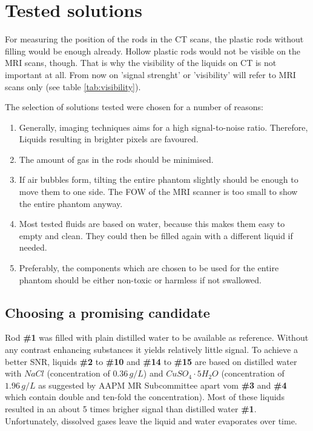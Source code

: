 \section{Tested solutions}
\newpage

For measuring the position of the rods in the CT scans, the plastic rods without filling would be enough already.
Hollow plastic rods would not be visible on the MRI scans, though.
That is why the visibility of the liquids on CT is not important at all.
From now on 'signal strenght' or 'visibility' will refer to MRI scans only (see table \ref{tab:visibility}).

The selection of solutions tested were chosen for a number of reasons:
\begin{enumerate}[label=\textbf{\arabic*.}]
\item Generally, imaging techniques aims for a high signal-to-noise ratio. Therefore, Liquids resulting in brighter pixels are favoured.
\item The amount of gas in the rods should be minimised.
\item If air bubbles form, tilting the entire phantom slightly should be enough to move them to one side. The FOW of the MRI scanner is too small to show the entire phantom anyway.
\item Most tested fluids are based on water, because this makes them easy to empty and clean.
They could then be filled again with a different liquid if needed.
\item Preferably, the components which are chosen to be used for the entire phantom should be either non-toxic or harmless if not swallowed.
\end{enumerate}

\subsection{Choosing a promising candidate}

Rod \textbf{\#1} was filled with plain distilled water to be available as reference.
Without any contrast enhancing substances it yields relatively little signal.
To achieve a better SNR, liquids \textbf{\#2} to \textbf{\#10} and \textbf{\#14} to \textbf{\#15} are based on distilled water with $NaCl$ (concentration of $0.36 \, g/L$) and $CuSO_4\cdot5H_2O$ (concentration of $1.96 \, g/L$ as suggested by AAPM MR Subcommittee \cite{Jackson2009} apart vom \textbf{\#3} and \textbf{\#4} which contain double and ten-fold the concentration).
Most of these liquids resulted in an about 5 times brigher signal than distilled water \textbf{\#1}.
Unfortunately, dissolved gases leave the liquid and water evaporates over time.

